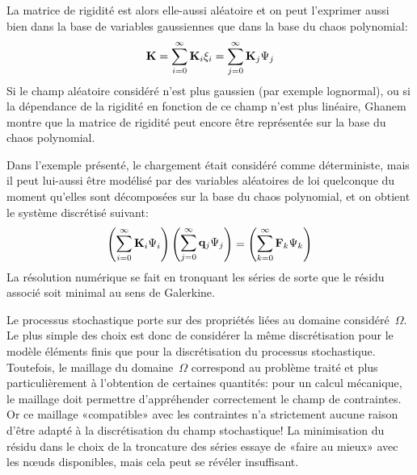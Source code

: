 La matrice de rigidité est alors elle-aussi aléatoire et on peut l'exprimer aussi bien dans la base de variables gaussiennes que dans la base du chaos polynomial:
\begin{equation*}\MM{K}=\dsum_{i=0}^\infty \MM{K}_i\xi_i = \dsum_{j=0}^\infty \MM{K}_j\Psi_j\end{equation*}
Si le champ aléatoire considéré n'est plus gaussien (par exemple lognormal), ou si la dépendance de la rigidité en fonction de ce champ n'est plus linéaire, Ghanem montre que la matrice de rigidité peut encore être représentée sur la base du chaos polynomial. 

\medskip
Dans l'exemple présenté, le chargement était considéré comme déterministe, mais il peut lui-aussi être modélisé par des variables aléatoires de loi quelconque du moment qu'elles sont décomposées sur la base du chaos polynomial, et on obtient le système discrétisé suivant:
\begin{equation}
\PP{\dsum_{i=0}^\infty \MM{K}_i\Psi_i}\PP{\dsum_{j=0}^\infty \VV{q}_j\Psi_j}=\PP{\dsum_{k=0}^\infty \VV{F}_k\Psi_k}
\end{equation}
La résolution numérique se fait en tronquant les séries de sorte que le résidu associé soit minimal au sens de Galerkine.

\medskip
Le processus stochastique porte sur des propriétés liées au domaine considéré~$\Omega$.
Le plus simple des choix est donc de considérer la même discrétisation pour le modèle éléments finis que pour la discrétisation du processus stochastique.
Toutefois, le maillage du domaine~$\Omega$ correspond au problème traité et plus particulièrement à l'obtention de certaines quantités: pour un calcul mécanique, le maillage doit permettre d'appréhender correctement le champ de contraintes.
Or ce maillage «compatible» avec les contraintes n'a strictement aucune raison d'être adapté à la discrétisation du champ stochastique!
La minimisation du résidu dans le choix de la troncature des séries essaye de «faire au mieux» avec les nœuds disponibles, mais cela peut se révéler insuffisant.

